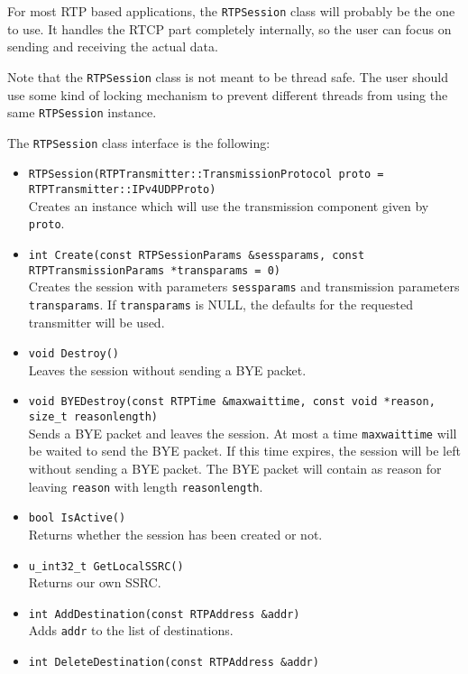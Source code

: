 \documentclass[12pt,a4paper]{article}
\begin{document}
				For most RTP based applications, the {\tt RTPSession} class
				will probably be the one to use. It handles the RTCP part
				completely internally, so the user can focus on sending and
				receiving the actual data.
				
				Note that the {\tt RTPSession} class is not meant to be thread
				safe. The user should use some kind of locking mechanism to prevent
				different threads from using the same {\tt RTPSession} instance.

				The {\tt RTPSession} class interface is the following:
				\begin{itemize}
					\item {\tt RTPSession(RTPTransmitter::Transmission\-Protocol proto = RTP\-Trans\-mitter::IPv4\-UDPProto)}\\
						Creates an instance which will use the transmission component given
						by {\tt proto}.
					\item {\tt int Create(const RTPSessionParams \&sessparams, const RTPTransmissionParams *transparams = 0)}\\
						Creates the session with parameters {\tt sessparams} and transmission parameters {\tt transparams}.
						If {\tt transparams} is NULL, the defaults for the requested transmitter will
						be used.
					\item {\tt void Destroy()}\\
						Leaves the session without sending a BYE packet.
					\item {\tt void BYEDestroy(const RTPTime \&maxwaittime, const void *reason, size\_t reasonlength)}\\
						Sends a BYE packet and leaves the session. At most a time {\tt maxwaittime} will
						be waited to send the BYE packet. If this time expires, the session will be
						left without sending a BYE packet. The BYE packet will contain as reason for
						leaving {\tt reason} with length {\tt reasonlength}.
					\item {\tt bool IsActive()}\\
						Returns whether the session has been created or not.
					\item {\tt u\_int32\_t GetLocalSSRC()}\\
						Returns our own SSRC.
					\item {\tt int AddDestination(const RTPAddress \&addr)}\\
						Adds {\tt addr} to the list of destinations.
					\item {\tt int DeleteDestination(const RTPAddress \&addr)}\\

\end{itemize}
\end{document}
